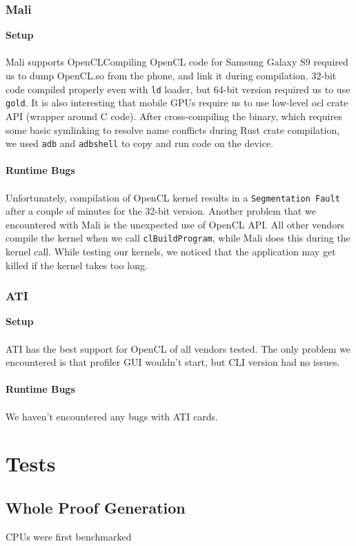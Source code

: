 \subsubsection{Mali}
\textbf{Setup}\\\\
Mali supports OpenCLCompiling OpenCL code for Samsung Galaxy S9 required us to dump OpenCL.so from the phone, and link it during compilation. 32-bit code compiled properly even with \texttt{ld} loader, but 64-bit version required us to use \texttt{gold}. It is also interesting that mobile GPUs require us to use low-level ocl crate API (wrapper around C code). After cross-compiling the binary, which requires some basic symlinking to resolve name conflicts during Rust crate compilation, we used \texttt{adb} and \texttt{adbshell} to copy and run code on the device.\\\\
\textbf{Runtime Bugs}\\\\
Unfortunately, compilation of OpenCL kernel results in a \texttt{Segmentation Fault} after a couple of minutes for the 32-bit version. Another problem that we encountered with Mali is the unexpected use of OpenCL API. All other vendors compile the kernel when we call \texttt{clBuildProgram}, while Mali does this during the kernel call. While testing our kernels, we noticed that the application may get killed if the kernel takes too long.

\subsubsection{ATI}
\textbf{Setup}\\\\
ATI has the best support for OpenCL of all vendors tested. The only problem we encountered is that profiler GUI wouldn't start, but CLI version had no issues.\\\\
\textbf{Runtime Bugs}\\\\
We haven't encountered any bugs with ATI cards.

\section{Tests}

\subsection{Whole Proof Generation}

CPUs were first benchmarked 

